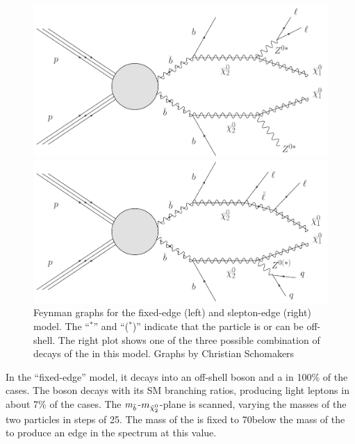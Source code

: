 \begin{figure}[htbp]
\centering
\begin{minipage}[t]{0.49\textwidth}
  \includegraphics[width=\textwidth]{plots/THEO/Feynman_graph_T6bblledgeZ.pdf}
\end{minipage}
\begin{minipage}[t]{0.49\textwidth}
\includegraphics[width=\textwidth]{plots/THEO/Feynman_graph_T6bbslepton.pdf}
\end{minipage}
\caption{Feynman graphs for the fixed-edge (left) and slepton-edge (right) model. The ``$^{*}$'' and ``($^{*}$)'' indicate that the particle is or can be off-shell. The right plot shows one of the three possible combination of decays of the \secondchi in this model. Graphs by Christian Schomakers}
\label{fig:sigFeyn}
\end{figure}

 In the ``fixed-edge'' model, it decays into an off-shell \Z boson and a \firstchi in 100\% of the cases. The \Z boson decays with its SM branching ratios, producing light leptons in about 7\% of the cases. The $m_{\tilde{b}}$-$m_{{\tilde{\chi}^0_2}}$-plane is scanned, varying the masses of the two particles in steps of 25\GeV. The mass of the \firstchi is fixed to 70\GeV below the mass of the \secondchi to produce an edge in the \mll spectrum at this value.

